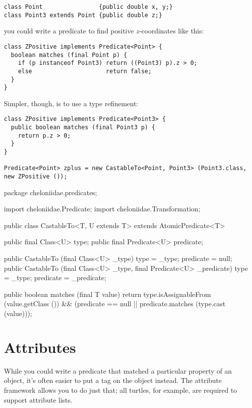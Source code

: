 \documentclass{report}
\begin{document}
\begin{verbatim}
class Point                {public double x, y;}
class Point3 extends Point {public double z;}
\end{verbatim}

        \noindent you could write a predicate to find positive $z$-coordinates like this:

\begin{verbatim}
class ZPositive implements Predicate<Point> {
  boolean matches (final Point p) {
    if (p instanceof Point3) return ((Point3) p).z > 0;
    else                     return false;
  }
}
\end{verbatim}

        Simpler, though, is to use a type refinement:

\begin{verbatim}
class ZPositive implements Predicate<Point3> {
  public boolean matches (final Point3 p) {
    return p.z > 0;
  }
}

Predicate<Point> zplus = new CastableTo<Point, Point3> (Point3.class, new ZPositive ());
\end{verbatim}

\begin{javacode}
package cheloniidae.predicates;

import cheloniidae.Predicate;
import cheloniidae.Transformation;

public class CastableTo<T, U extends T> extends AtomicPredicate<T> {
  public final Class<U>     type;
  public final Predicate<U> predicate;

  public CastableTo (final Class<U> _type) {type = _type; predicate = null;}
  public CastableTo (final Class<U> _type, final Predicate<U> _predicate)
    {type = _type; predicate = _predicate;}

  public boolean matches (final T value) {
    return type.isAssignableFrom (value.getClass ()) &&
           (predicate == null || predicate.matches (type.cast (value)));
  }
}
\end{javacode}

\section {Attributes} \label{sec:attributes}
      While you could write a predicate that matched a particular property of an object, it's often easier to put a tag on the object instead. The attribute
      framework allows you to do just that; all turtles, for example, are required to support attribute lists.
\end{document}
